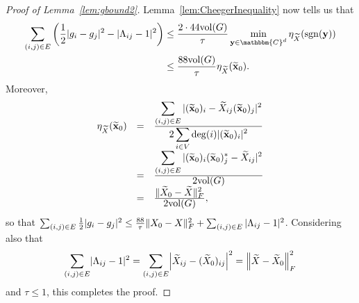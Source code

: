 \begin{proof}[Proof of Lemma~\ref{lem:gbound2}]
Lemma~\ref{lem:CheegerInequality} now tells us that 
\begin{equation} \begin{aligned} \sum_{(i, j) \in E}  \left(\frac{1}{2} |g_i - g_j|^2 - |\Lambda_{ij} - 1|^2\right) &\le \bigfrac{2 \cdot 44 \vol(G)}{\tau} \min_{\y \in \mathbbm{C}^d} \eta_{\tX}( \sgn(\y) ) \\&\le \bigfrac{88 \vol(G)}{\tau} \eta_{\tX}(\tx_0).\end{aligned} \label{eq:de-cheeg} \end{equation}
Moreover,%
$$\begin{array}{rcl}%
\eta_{\tX}(\tx_0) & = & \bigfrac{\sum_{(i, j) \in E} |(\tx_0)_i - \tX_{ij} (\tx_0)_j |^2}{2 \sum_{i \in V} \deg(i) |(\tx_0)_i|^2} \\%
& = & \bigfrac{\sum_{(i, j) \in E} |(\tx_0)_i (\tx_0)^*_j - \tX_{ij}|^2}{2 \vol(G)} \\%
& = & \bigfrac{ \| \widetilde{\X}_0 - \tX \|_F^2}{2 \vol(G)},%
\end{array}$$%
so that $\sum_{(i, j) \in E} \frac{1}{2} |g_i - g_j|^2 \le \frac{88}{\tau} \lVert X_0 - X \rVert^2_F + \sum_{(i, j) \in E} |\Lambda_{ij} - 1|^2$.  Considering also that \begin{equation} \sum_{(i, j) \in E} \abs{\Lambda_{ij} - 1}^2 = \sum_{(i, j) \in E} \abs*{\tX_{ij} - (\tX_0)_{ij}}^2 = \norm*{\tX - \tX_0}_F^2 \label{eq:Lamb=Frob}\end{equation} and $\tau \le 1$, this completes the proof.
\end{proof}


